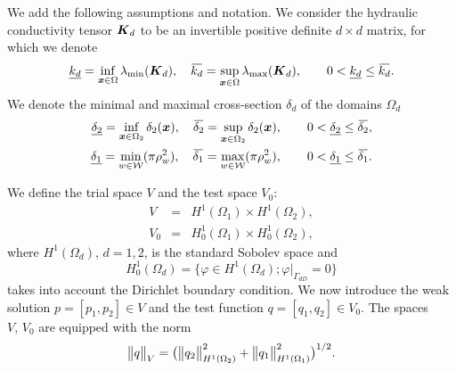 We add the following assumptions and notation. We consider the hydraulic conductivity tensor $\mathbf{\boldsymbol{K}}_d$
to be an invertible positive definite $d\times d$ matrix, for which we denote
\begin{equation}
    \underline{k_d} = \inf\limits_{\bx\in\Omega}\lambda_{\min}(\vc K_d), \quad
    \overbar{k_d}   = \sup\limits_{\bx\in\Omega}\lambda_{\max}(\vc K_d), \qquad
     0 < \underline{k_d} \leq \overbar{k_d}.
\end{equation}
We denote the minimal and maximal cross-section $\delta_d$ of the domains $\Omega_d$
\begin{eqnarray}
    \underline{\delta_2} = \inf\limits_{\bx\in\Omega_2} \delta_2(\vc x), \quad
    \overbar{\delta_2}   = \sup\limits_{\bx\in\Omega_2} \delta_2(\vc x), \qquad
     0 < \underline{\delta_2} \leq \overbar{\delta_2},\\
     \underline{\delta_1} = \min\limits_{w\in\mathcal{W}} (\pi\rho_w^2), \quad
    \overbar{\delta_1}    = \max\limits_{w\in\mathcal{W}} (\pi\rho_w^2), \qquad
     0 < \underline{\delta_1} \leq \overbar{\delta_1}.
\end{eqnarray}

We define the trial space $V$ and the test space $V_0$:
\begin{eqnarray} \label{eqn:spaces}
  V &=& H^1(\Omega_1)\times H^1(\Omega_2), \\
  V_0 &=& H^1_0(\Omega_1)\times H^1_0(\Omega_2),
\end{eqnarray}
where $H^1(\Omega_d)$, $d=1,2$, is the standard Sobolev space and 
\[ H^1_0(\Omega_d)=\{\varphi\in H^1(\Omega_d); \varphi|_{\Gamma_{dD}}=0\} \]
takes into account the Dirichlet boundary condition.
We now introduce the weak solution $p=[p_1,p_2]\in V$ and the test function $q=[q_1,q_2]\in V_0$.
The spaces $V,\,V_0$ are equipped with the norm
\begin{equation}
    \bigl\Vert q\bigr\Vert_V = \big( \bigl\Vert q_2\bigr\Vert^2_{H^1(\Omega_2)} + \bigl\Vert q_1\bigr\Vert^2_{H^1(\Omega_1)} \big)^{1/2}.
\end{equation}

